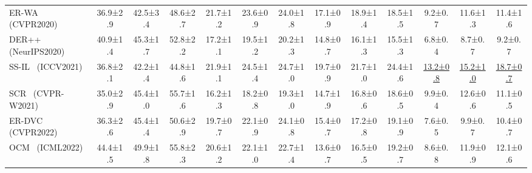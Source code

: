 \begin{table}[t]
\begin{tabular}{l|ccc|ccc|ccc|ccc}
ER-WA~\cite{zhao2020maintaining} (CVPR2020)& 36.9\scriptsize±2.9& 42.5\scriptsize±3.4                 & 48.6\scriptsize±2.7                 & 21.7\scriptsize±1.2                  & 23.6\scriptsize±0.9                  & 24.0\scriptsize±1.8 & 17.1\scriptsize±0.9                   & 18.9\scriptsize±1.4                  & 18.5\scriptsize±1.5 & 9.2\scriptsize±0.7                   & 11.6\scriptsize±1.3                  & 11.4\scriptsize±1.6\\
DER++~\cite{buzzega2020dark} (NeurIPS2020)& 40.9\scriptsize±1.4& 45.3\scriptsize±1.7                 & 52.8\scriptsize±2.2                 & 17.2\scriptsize±1.1                  & 19.5\scriptsize±1.2                  & 20.2\scriptsize±1.3 & 14.8\scriptsize±0.7                   & 16.1\scriptsize±1.3                  & 15.5\scriptsize±1.3 & 6.8\scriptsize±0.4                   & 8.7\scriptsize±0.7                  & 9.2\scriptsize±0.7\\
SS-IL~\cite{ahn2021ss} (ICCV2021) & 36.8\scriptsize±2.1 & 42.2\scriptsize±1.4                 &  44.8\scriptsize±1.6                 & 21.9\scriptsize±1.1                  & 24.5\scriptsize±1.4                  & 24.7\scriptsize±1.0 & 19.7\scriptsize±0.9                   & 21.7\scriptsize±1.0                  & 24.4\scriptsize±1.6 &\underline{13.2\scriptsize±0.8}                   & \underline{15.2\scriptsize±1.0}                  & \underline{18.7\scriptsize±0.7}\\
SCR~\cite{mai2021supervised} (CVPR-W2021) & 35.0\scriptsize±2.9& 45.4\scriptsize±1.0                 & 55.7\scriptsize±1.6                 & 16.2\scriptsize±1.3                  & 18.2\scriptsize±0.8                  & 19.3\scriptsize±1.0 & 14.7\scriptsize±1.9                   & 16.8\scriptsize±0.6                  & 18.6\scriptsize±0.5 & 9.9\scriptsize±0.4                   & 12.6\scriptsize±0.6                  & 11.1\scriptsize±0.5\\
ER-DVC~\cite{gu2022not} (CVPR2022) & 36.3\scriptsize±2.6 & 45.4\scriptsize±1.4                 &  50.6\scriptsize±2.9                & 19.7\scriptsize±0.7                  & 22.1\scriptsize±0.9                  & 24.1\scriptsize±0.8 & 15.4\scriptsize±0.7                   & 17.2\scriptsize±0.8                  & 19.1\scriptsize±0.9 & 7.6\scriptsize±0.5                   & 9.9\scriptsize±0.7                  & 10.4\scriptsize±0.7\\
OCM~\cite{guo2022online} (ICML2022) & {44.4\scriptsize±1.5} & {49.9\scriptsize±1.8}                 &  {55.8\scriptsize±2.3}                & 20.6\scriptsize±1.2                  & 22.1\scriptsize±1.0                  & 22.7\scriptsize±1.4 & 13.6\scriptsize±0.7                   & 16.5\scriptsize±0.5                  & 19.2\scriptsize±0.7 & 8.6\scriptsize±0.8                   & 11.9\scriptsize±0.9                  & 12.1\scriptsize±0.6\\

\end{tabular}
\end{table}

